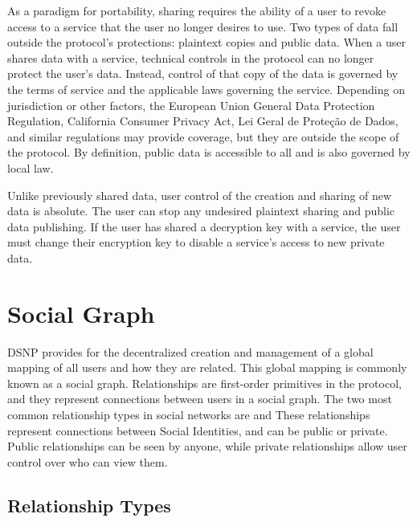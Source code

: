 \documentclass[12pt,letterpaper]{article}
\begin{document}
As a paradigm for portability, sharing requires the ability of a user to revoke access to a
service that the user no longer desires to use. Two types of data fall outside the
protocol's protections: plaintext copies and public data. When a user shares data with a
service, technical controls in the protocol can no longer protect the user's data.  Instead,
control of that copy of the data is governed by the terms of service and the applicable laws
governing the service. Depending on jurisdiction or other factors, the European Union
General Data Protection Regulation,\cite{gdpr2016} California Consumer Privacy
Act,\cite{ccpa2018} Lei Geral de Proteção de Dados,\cite{lgpd2019} and similar regulations
may provide coverage, but they are outside the scope of the protocol. By definition, public
data is accessible to all and is also governed by local law.

Unlike previously shared data, user control of the creation and sharing of new data is
absolute. The user can stop any undesired plaintext sharing and public data publishing. If
the user has shared a decryption key with a service, the user must change their encryption
key to disable a service's access to new private data.

\section{Social Graph}\label{sec:social_graph}

DSNP provides for the decentralized creation and management of a global mapping of all users
and how they are related. This global mapping is commonly known as a social graph.
Relationships are first-order primitives in the protocol, and they represent connections
between users in a social graph. The two most common relationship types in social networks
are  and  These relationships represent connections between Social
Identities, and can be public or private. Public relationships can be seen by anyone, while
private relationships allow user control over who can view them.

\subsection{Relationship Types}\label{sec:relationship_types}
\end{document}
